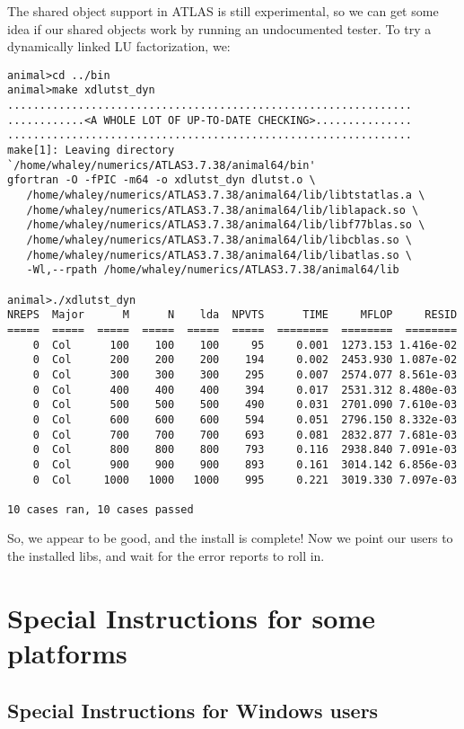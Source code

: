 \documentclass[11pt]{article}
\begin{document}
The shared object support in ATLAS is still experimental, so we
can get some idea if our shared objects work by running an undocumented
tester.  To try a dynamically linked LU factorization, we:
\begin{footnotesize}
\begin{verbatim}
animal>cd ../bin
animal>make xdlutst_dyn
...............................................................
............<A WHOLE LOT OF UP-TO-DATE CHECKING>...............
...............................................................
make[1]: Leaving directory `/home/whaley/numerics/ATLAS3.7.38/animal64/bin'
gfortran -O -fPIC -m64 -o xdlutst_dyn dlutst.o \
   /home/whaley/numerics/ATLAS3.7.38/animal64/lib/libtstatlas.a \
   /home/whaley/numerics/ATLAS3.7.38/animal64/lib/liblapack.so \
   /home/whaley/numerics/ATLAS3.7.38/animal64/lib/libf77blas.so \
   /home/whaley/numerics/ATLAS3.7.38/animal64/lib/libcblas.so \
   /home/whaley/numerics/ATLAS3.7.38/animal64/lib/libatlas.so \
   -Wl,--rpath /home/whaley/numerics/ATLAS3.7.38/animal64/lib

animal>./xdlutst_dyn
NREPS  Major      M      N    lda  NPVTS      TIME     MFLOP     RESID
=====  =====  =====  =====  =====  =====  ========  ========  ========
    0  Col      100    100    100     95     0.001  1273.153 1.416e-02
    0  Col      200    200    200    194     0.002  2453.930 1.087e-02
    0  Col      300    300    300    295     0.007  2574.077 8.561e-03
    0  Col      400    400    400    394     0.017  2531.312 8.480e-03
    0  Col      500    500    500    490     0.031  2701.090 7.610e-03
    0  Col      600    600    600    594     0.051  2796.150 8.332e-03
    0  Col      700    700    700    693     0.081  2832.877 7.681e-03
    0  Col      800    800    800    793     0.116  2938.840 7.091e-03
    0  Col      900    900    900    893     0.161  3014.142 6.856e-03
    0  Col     1000   1000   1000    995     0.221  3019.330 7.097e-03

10 cases ran, 10 cases passed
\end{verbatim}
\end{footnotesize}
So, we appear to be good, and the install is complete!  Now we point our
users to the installed libs, and wait for the error reports to roll in.

\section{Special Instructions for some platforms}
\subsection{Special Instructions for Windows users}
\label{sec-windows}
\end{document}
